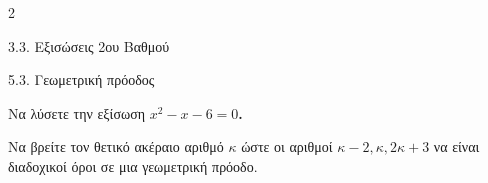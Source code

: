 \begin{ylh}{2}
    \item 3.3. Εξισώσεις 2ου Βαθμού
    \item 5.3. Γεωμετρική πρόοδος
\end{ylh}

\begin{alist}
\item Να λύσετε την εξίσωση $x^{2} - x - 6 = 0$\textbf{.}
\item Να βρείτε τον θετικό ακέραιο αριθμό $\kappa$ ώστε οι αριθμοί $\kappa - 2,\kappa,2\kappa + 3$ να είναι διαδοχικοί όροι σε μια γεωμετρική πρόοδο.
\end{alist}

